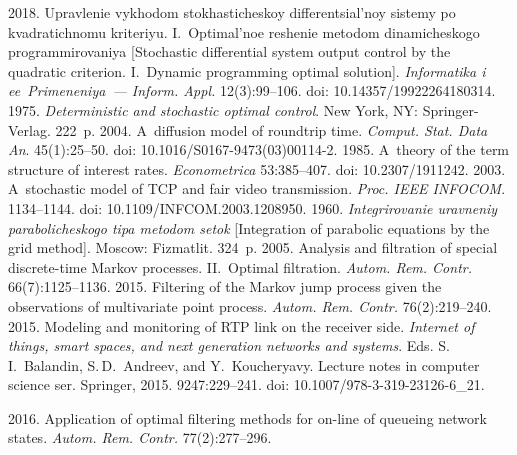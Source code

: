   \begin{multicols}{2}

\renewcommand{\bibname}{\protect\rmfamily References}

{\small\frenchspacing
 {%
 \begin{thebibliography}{99}

 2018. Upravlenie vykhodom stokhasticheskoy differentsial'noy
sistemy po kvadratichnomu kriteriyu. I.~Optimal'noe reshenie
metodom dinamicheskogo programmirovaniya
[Stochastic differential system output control
by the quadratic criterion. I.~Dynamic
programming optimal solution]. \textit{Informatika i ee~Primeneniya~--- Inform. Appl.}  
12(3):99--106. doi: 
10.14357/19922264180314. 
 1975. \textit{Deterministic and 
stochastic optimal control}. New York, NY: Springer-Verlag. 222~p.
 2004. A~diffusion model of roundtrip 
time. \textit{Comput. Stat.  Data An}. 45(1):25--50.
doi: 10.1016/S0167-9473(03)00114-2.
 1985. A~theory of the 
term structure of interest rates. \textit{Econometrica} 53:385--407.
doi: 10.2307/1911242.
 2003. A~stochastic model of TCP and fair video 
transmission. \textit{Proc. IEEE INFOCOM}. 1134--1144.
doi: 10.1109/INFCOM.2003.1208950.
 1960. \textit{Integrirovanie uravneniy pa\-ra\-bo\-li\-che\-sko\-go 
tipa metodom setok} [Integration of parabolic equations by the grid method]. 
Moscow: Fizmatlit. 324~p.
 2005. Analysis and filtration of 
special discrete-time Markov processes. II.~Optimal filtration. \textit{Autom. 
Rem. Contr.} 66(7):1125--1136.
 2015. Filtering 
of the Markov jump process given the observations of multivariate point 
process. \textit{Autom. Rem. Contr.} 76(2):219--240.
 2015. Modeling and monitoring 
of RTP link on the receiver side. 
\textit{Internet of things, smart spaces, and next generation
networks and systems}. Eds. S.\,I.~Balandin, S.\,D.~Andreev,
and Y.~Koucheryavy. Lecture notes in computer science ser. Springer, 
2015. 9247:229--241. doi: 10.1007/978-3-319-23126-6\_21.

 2016. Application of optimal filtering methods for  
on-line of queueing network states. \textit{Autom. Rem. Contr.} 
77(2):277--296.
\end{thebibliography}

 }
 }

\end{multicols}

